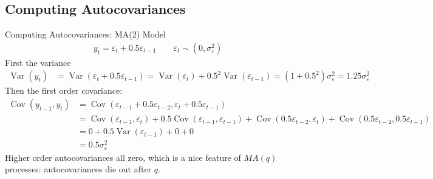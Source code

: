 \documentclass[aspectratio=169, handout]{beamer}
\newcommand{\Cov}{\operatorname{Cov}}
\newcommand{\Var}{\operatorname{Var}}
\begin{document}



\subsection{Computing Autocovariances}


{\scriptsize
\begin{frame}{Computing Autocovariances: MA(2)}
Model
\begin{align*}
  y_t = \varepsilon_t + 0.5 \varepsilon_{t-1}
  \qquad
  \varepsilon_t\sim(0,\sigma^2_\varepsilon)
\end{align*}
First the variance
\begin{align*}
  \Var(y_t)
  &= \Var(\varepsilon_t + 0.5 \varepsilon_{t-1})
  = \Var(\varepsilon_t) + 0.5^2 \Var(\varepsilon_{t-1})
  = (1+0.5^2) \sigma^2_\varepsilon
  = 1.25 \sigma^2_\varepsilon
\end{align*}
\pause
Then the first order covariance:
\begin{align*}
  \Cov(y_{t-1},y_{t})
  &=
  \Cov(\varepsilon_{t-1} + 0.5 \varepsilon_{t-2}, \varepsilon_t + 0.5 \varepsilon_{t-1})
  \\
  &=
  \Cov(\varepsilon_{t-1}, \varepsilon_t)
  + 0.5 \Cov(\varepsilon_{t-1}, \varepsilon_{t-1})
  + \Cov(0.5 \varepsilon_{t-2}, \varepsilon_t)
  + \Cov(0.5 \varepsilon_{t-2}, 0.5\varepsilon_{t-1})
  \\
  &=
  0
  + 0.5 \Var(\varepsilon_{t-1})
  + 0
  + 0
  \\
  &=
  0.5 \sigma^2_\varepsilon
\end{align*}
Higher order autocovariances all zero, which is a nice feature of $MA(q)$
processes: autocovariances die out after $q$.
\end{frame}
}
\end{document}
